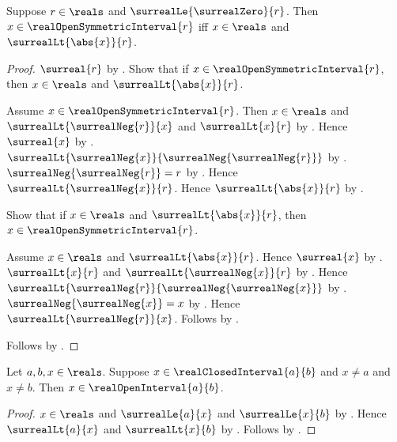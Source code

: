 \begin{proposition}\label{real_open_symmetric_interval_iff_abs_bound}
    Suppose $r\in\reals$ and $\surrealLe{\surrealZero}{r}$.
    Then $x\in\realOpenSymmetricInterval{r}$ iff
        $x\in\reals$ and $\surrealLt{\abs{x}}{r}$.
\end{proposition}
\begin{proof}
    $\surreal{r}$ by .
    Show that if $x\in\realOpenSymmetricInterval{r}$, then
        $x\in\reals$ and $\surrealLt{\abs{x}}{r}$.
    \begin{subproof}
        Assume $x\in\realOpenSymmetricInterval{r}$.
        Then $x\in\reals$ and
            $\surrealLt{\surrealNeg{r}}{x}$ and $\surrealLt{x}{r}$
            by
            .
        Hence $\surreal{x}$ by .
        $\surrealLt{\surrealNeg{x}}
            {\surrealNeg{\surrealNeg{r}}}$
            by
            .
        $\surrealNeg{\surrealNeg{r}}=r$
            by .
        Hence $\surrealLt{\surrealNeg{x}}{r}$.
        Hence $\surrealLt{\abs{x}}{r}$
            by .
    \end{subproof}
    Show that if $x\in\reals$ and $\surrealLt{\abs{x}}{r}$, then
        $x\in\realOpenSymmetricInterval{r}$.
    \begin{subproof}
        Assume $x\in\reals$ and $\surrealLt{\abs{x}}{r}$.
        Hence $\surreal{x}$ by .
        $\surrealLt{x}{r}$ and $\surrealLt{\surrealNeg{x}}{r}$
            by .
        Hence
            $\surrealLt{\surrealNeg{r}}{\surrealNeg{\surrealNeg{x}}}$
            by
            .
        $\surrealNeg{\surrealNeg{x}}=x$
            by .
        Hence $\surrealLt{\surrealNeg{r}}{x}$.
        Follows by
            .
    \end{subproof}
    Follows by \auto.
\end{proof}

\begin{proposition}\label{real_closed_interval_nonendpoint_in_open_interval}
    Let $a,b,x\in\reals$.
    Suppose $x\in\realClosedInterval{a}{b}$ and
        $x\neq a$ and $x\neq b$.
    Then $x\in\realOpenInterval{a}{b}$.
\end{proposition}
\begin{proof}
    $x\in\reals$ and $\surrealLe{a}{x}$ and $\surrealLe{x}{b}$
        by .
    Hence $\surrealLt{a}{x}$ and $\surrealLt{x}{b}$
        by .
    Follows by .
\end{proof}

